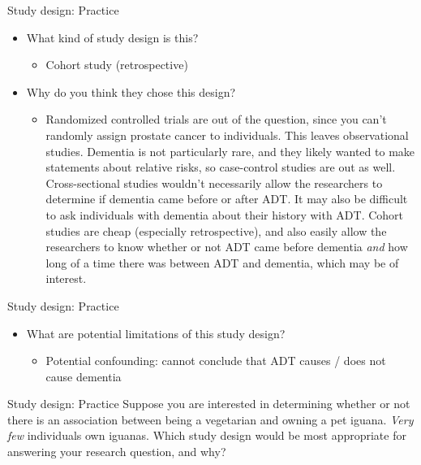 \documentclass[10pt,t]{beamer}
\begin{document}
\begin{frame}{Study design: Practice}
\begin{itemize}
	\item What kind of study design is this?
	\begin{itemize}
		\item[]  \color{cyan} Cohort study (retrospective)
	\end{itemize}
	\item Why do you think they chose this design? %
	\begin{itemize}
		\item[] \color{cyan} Randomized controlled trials are out of the question, since you can't randomly assign prostate cancer to individuals. This leaves observational studies. Dementia is not particularly rare, and they likely wanted to make statements about relative risks, so case-control studies are out as well. Cross-sectional studies wouldn't necessarily allow the researchers to determine if dementia came before or after ADT. It may also be difficult to ask individuals with dementia about their history with ADT. Cohort studies are cheap (especially retrospective), and also easily allow the researchers to know whether or not ADT came before dementia \textit{and} how long of a time there was between ADT and dementia, which may be of interest.
	\end{itemize}
\end{itemize}
\end{frame}

\begin{frame}{Study design: Practice}
\begin{itemize}
	\item What are potential limitations of this study design?
	\begin{itemize}
		\item[] \color{cyan} Potential confounding: cannot conclude that ADT causes / does not cause dementia
	\end{itemize}
\end{itemize}
\end{frame}

\begin{frame}{Study design: Practice}
Suppose you are interested in determining whether or not there is an association between being a vegetarian and owning a pet iguana. \textit{Very few} individuals own iguanas. Which study design would be most appropriate for answering your research question, and why?
\end{frame}
\end{document}
